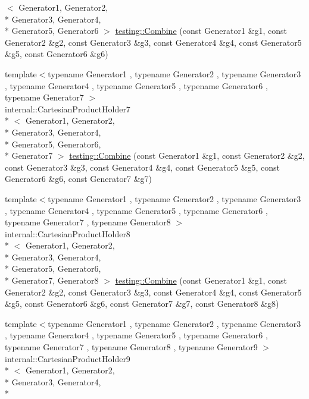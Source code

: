\begin{DoxyCompactItemize}
$<$ Generator1, Generator2, \\*
Generator3, Generator4, \\*
Generator5, Generator6 $>$ \hyperlink{namespacetesting_adccda33f9b3ad18896cb341979fe12b4}{testing\-::\-Combine} (const Generator1 \&g1, const Generator2 \&g2, const Generator3 \&g3, const Generator4 \&g4, const Generator5 \&g5, const Generator6 \&g6)
\item 
{\footnotesize template$<$typename Generator1 , typename Generator2 , typename Generator3 , typename Generator4 , typename Generator5 , typename Generator6 , typename Generator7 $>$ }\\internal\-::\-Cartesian\-Product\-Holder7\\*
$<$ Generator1, Generator2, \\*
Generator3, Generator4, \\*
Generator5, Generator6, \\*
Generator7 $>$ \hyperlink{namespacetesting_a314759a93c251ca78b75c7f3ae8eda80}{testing\-::\-Combine} (const Generator1 \&g1, const Generator2 \&g2, const Generator3 \&g3, const Generator4 \&g4, const Generator5 \&g5, const Generator6 \&g6, const Generator7 \&g7)
\item 
{\footnotesize template$<$typename Generator1 , typename Generator2 , typename Generator3 , typename Generator4 , typename Generator5 , typename Generator6 , typename Generator7 , typename Generator8 $>$ }\\internal\-::\-Cartesian\-Product\-Holder8\\*
$<$ Generator1, Generator2, \\*
Generator3, Generator4, \\*
Generator5, Generator6, \\*
Generator7, Generator8 $>$ \hyperlink{namespacetesting_ac5508abb9d05e22332c792d101c13b2b}{testing\-::\-Combine} (const Generator1 \&g1, const Generator2 \&g2, const Generator3 \&g3, const Generator4 \&g4, const Generator5 \&g5, const Generator6 \&g6, const Generator7 \&g7, const Generator8 \&g8)
\item 
{\footnotesize template$<$typename Generator1 , typename Generator2 , typename Generator3 , typename Generator4 , typename Generator5 , typename Generator6 , typename Generator7 , typename Generator8 , typename Generator9 $>$ }\\internal\-::\-Cartesian\-Product\-Holder9\\*
$<$ Generator1, Generator2, \\*
Generator3, Generator4, \\*

\end{DoxyCompactItemize}
